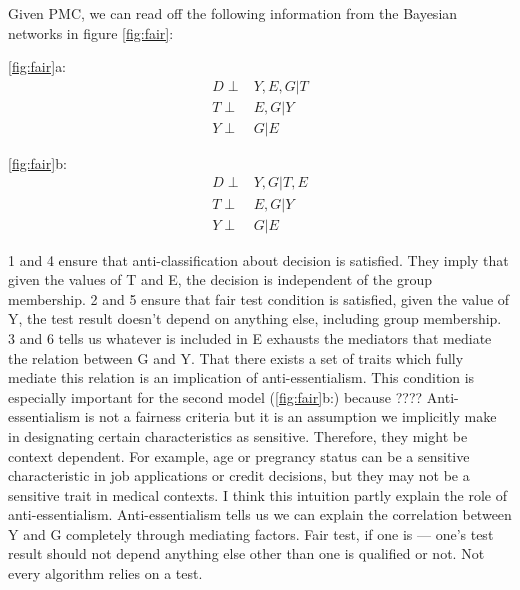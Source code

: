 \documentclass{article}
\begin{document}
Given PMC, we can read off the following information from the Bayesian networks in figure \ref{fig:fair}:

\setcounter{equation}{0}
\ref{fig:fair}a: \\

\begin{align}
  D \perp & Y, E, G | T \\
  T \perp & E, G | Y \\
  Y \perp & G | E
\end{align}


\ref{fig:fair}b: \\

\begin{align}
  D \perp & Y, G | T, E \\
  T \perp & E, G | Y \\
  Y \perp & G | E
\end{align}

1 and 4 ensure that anti-classification about decision is satisfied. They imply that given the values of T and E, the decision is independent of the group membership. 2 and 5 ensure that fair test condition is satisfied, given the value of Y, the test result doesn't depend on anything else, including group membership. 3 and 6 tells us whatever is included in E exhausts the mediators that mediate the relation between G and Y. That there exists a set of traits which fully mediate this relation is an implication of anti-essentialism. This condition is especially important for the second model (\ref{fig:fair}b:) because ???? Anti-essentialism is not a fairness criteria but it is an assumption we implicitly make in designating certain characteristics as sensitive. Therefore, they might be context dependent. For example, age or pregrancy status can be a sensitive characteristic in job applications or credit decisions, but they may not be a sensitive trait in medical contexts. I think this intuition partly explain the role of anti-essentialism. Anti-essentialism tells us we can explain the correlation between Y and G completely through mediating factors. Fair test, if one is --- one's test result should not depend anything else other than one is qualified or not. Not every algorithm relies on a test. 
\end{document}
